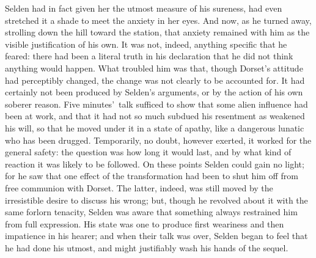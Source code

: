 \documentclass[12pt,a4paper]{book}
\begin{document}
Selden had in fact given her the utmost measure of his sureness,
had even stretched it a shade to meet the anxiety in her eyes. 
And now, as he turned away, strolling down the hill toward the
station, that anxiety remained with him as the visible
justification of his own. It was not, indeed, anything specific
that he feared: there had been a literal truth in his declaration
that he did not think anything would happen. What troubled him
was that, though Dorset's attitude had perceptibly changed, the
change was not clearly to be accounted for. It had certainly not
been produced by Selden's arguments, or by the action of his own
soberer reason. Five minutes'\ talk sufficed to show that some
alien influence had been at work, and that it had not so much
subdued his resentment as weakened his will, so that he moved
under it in a state of apathy, like a dangerous lunatic who has
been drugged. Temporarily, no doubt, however exerted, it worked
for the general safety: the question was how long it would last,
and by what kind of reaction it was likely to be followed. On
these points Selden could gain no light; for he saw that one
effect of the transformation had been to shut him off from free
communion with Dorset. The latter, indeed, was still moved by the
irresistible desire to discuss his wrong; but, though he revolved
about it with the same forlorn tenacity, Selden was aware that
something always restrained him from full expression. His state
was one to produce first weariness and then impatience in his
hearer; and when their talk was over, Selden began to feel that
he had done his utmost, and might justifiably wash his hands of
the sequel.
\end{document}
